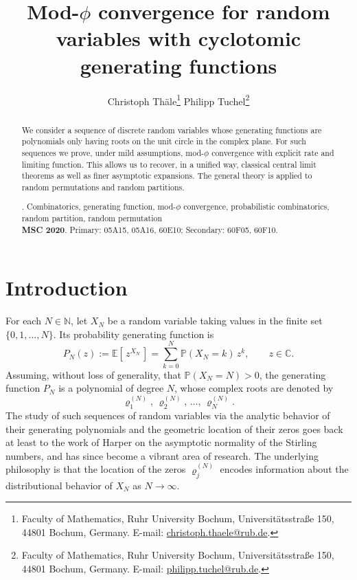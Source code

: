 \documentclass[11pt,a4paper]{scrartcl}
\numberwithin{equation}{section}
\theoremstyle{plain}
\theoremstyle{definition}
\theoremstyle{remark}
\begin{document}
\title{Mod-$\phi$ convergence for random variables with cyclotomic generating functions}
\author{
  Christoph Th\"ale\thanks{Faculty of Mathematics, Ruhr University Bochum, Universit\"atsstra\ss e 150, 44801 Bochum, Germany. E-mail: \href{mailto:christoph.thaele@rub.de}{christoph.thaele@rub.de}.}
  \qquad
  Philipp Tuchel\thanks{Faculty of Mathematics, Ruhr University Bochum, Universit\"atsstra\ss e 150, 44801 Bochum, Germany. E-mail: \href{mailto:philipp.tuchel@rub.de}{philipp.tuchel@rub.de}.}
}
\date{}
\maketitle

\begin{abstract}
  \small We consider a sequence of discrete random variables whose generating functions are polynomials only having roots on the unit circle in the complex plane. For such sequences we prove, under mild assumptions, mod-$\phi$ convergence with explicit rate and limiting function. This allows us to recover, in a unified way, classical central limit theorems as well as finer asymptotic expansions. The general theory is applied to random permutations and random partitions.

  \medspace
  \vskip 1mm
  . {Combinatorics, generating function, mod-$\phi$ convergence, probabilistic combinatorics, random partition, random permutation}\\
  {\textbf{MSC 2020}}. Primary: 05A15, 05A16, 60E10; Secondary: 60F05, 60F10.
\end{abstract}



\section{Introduction}

For each \(N \in \mathbb{N}\), let \(X_{N}\) be a random variable taking values in the finite set \(\{0,1,\dots,N\}\).  Its probability generating function is
$$
P_{N}(z) := \mathbb{E}[\,z^{X_{N}}\,] = \sum_{k=0}^{N} \mathbb{P}(X_{N}=k)\,z^{k}, 
\qquad z \in \mathbb{C}.
$$  
Assuming, without loss of generality, that \(\mathbb{P}(X_{N}=N)>0\), the generating function \(P_{N}\) is a polynomial of degree \(N\), whose complex roots are denoted by 
$$
\varrho_{1}^{(N)},\,\varrho_{2}^{(N)},\,\dots,\,\varrho_{N}^{(N)}.
$$
The study of such sequences of random variables via the analytic behavior of their generating polynomials and the geometric location of their zeros goes back at least to the work of Harper \cite{Harper} on the asymptotic normality of the Stirling numbers, and has since become a vibrant area of research.  The underlying philosophy is that the location of the zeros \(\varrho_{j}^{(N)}\) encodes information about the distributional behavior of \(X_{N}\) as \(N \to \infty\).  
\end{document}
